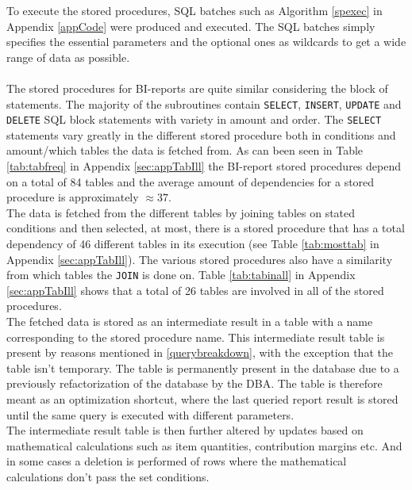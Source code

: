\documentclass{cslthse-msc}
\begin{document}
To execute the stored procedures, SQL batches such as Algorithm \ref{spexec} in Appendix \ref{appCode} were produced and executed. The SQL batches simply specifies the essential parameters and the optional ones as wildcards to get a wide range of data as possible.\\\\  
The stored procedures for BI-reports are quite similar considering the block of statements. The majority of the subroutines contain \texttt{SELECT}, \texttt{INSERT}, \texttt{UPDATE} and \texttt{DELETE} SQL block statements with variety in amount and order. The \texttt{SELECT} statements vary greatly in the different stored procedure both in conditions and amount/which tables the data is fetched from. As can been seen in Table \ref{tab:tabfreq} in Appendix \ref{sec:appTabIll} the BI-report stored procedures  depend on a total of 84 tables and the average amount of dependencies for a stored procedure is approximately $\approx37$.\\
The data is fetched from the different tables by joining tables on stated conditions and then selected, at most, there is a stored procedure that has a total dependency of 46 different tables in its execution (see Table \ref{tab:mosttab} in Appendix \ref{sec:appTabIll}). The various stored procedures also have a similarity from which tables the \texttt{JOIN} is done on. Table \ref{tab:tabinall} in Appendix \ref{sec:appTabIll} shows that a total of 26 tables are involved in all of the stored procedures.\\
The fetched data is stored as an intermediate result in a table with a name corresponding to the stored procedure name. This intermediate result table is present by reasons mentioned in \ref{querybreakdown}, with the exception that the table isn't temporary. The table is permanently present in the database due to a previously refactorization of the database by the DBA. The table is therefore meant as an optimization shortcut, where the last queried report result is stored until the same query is executed with different parameters.\\
The intermediate result table is then further altered by updates based on mathematical calculations such as item quantities, contribution margins etc. And in some cases a deletion is performed of rows where the mathematical calculations don't pass the set conditions.   
       
\end{document}
